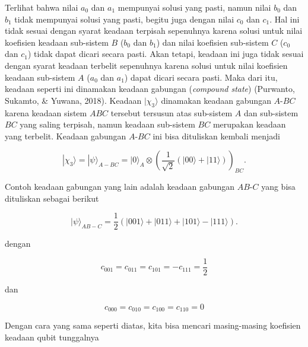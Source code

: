 Terlihat bahwa nilai $a_0$ dan $a_1$ mempunyai solusi yang pasti, namun nilai $b_0$ dan $b_1$ tidak mempunyai solusi yang pasti, begitu juga dengan nilai $c_0$ dan $c_1$. Hal ini tidak sesuai dengan syarat keadaan terpisah sepenuhnya karena solusi untuk nilai koefisien keadaan sub-sistem $B$ ($b_0$ dan $b_1$) dan nilai koefisien sub-sistem $C$ ($c_0$ dan $c_1$) tidak dapat dicari secara pasti. Akan tetapi, keadaan ini juga tidak sesuai dengan syarat keadaan terbelit sepenuhnya karena solusi untuk nilai koefisien keadaan sub-sistem $A$ ($a_0$ dan $a_1$) dapat dicari secara pasti. Maka dari itu, keadaan seperti ini dinamakan
keadaan gabungan (\textit{compound state}) (Purwanto, Sukamto, \& Yuwana, 2018).
Keadaan $|\chi_3\rangle$ dinamakan keadaan gabungan $A$-$BC$
karena keadaan sistem $ABC$ tersebut tersusun atas sub-sistem $A$ dan sub-sistem $BC$ yang saling terpisah, namun keadaan sub-sistem $BC$ merupakan keadaan yang terbelit. Keadaan gabungan $A$-$BC$ ini bisa dituliskan kembali menjadi

\begin{equation}
|\chi_3\rangle
=
|\psi\rangle_{A-BC}
=
|0\rangle_A \otimes
\left(
\frac{1}{\sqrt{2}}
(|00\rangle + |11\rangle)
\right)_{BC} .
\end{equation}

Contoh keadaan gabungan yang lain adalah keadaan gabungan $AB$-$C$ yang bisa dituliskan sebagai berikut

\begin{equation}
|\psi\rangle_{AB-C}
=
\frac{1}{2}
\left(
|001\rangle + |011\rangle + |101\rangle - |111\rangle
\right) .
\end{equation}

dengan

\begin{equation}
	c_{001}=c_{011}=c_{101}=-c_{111}=\frac{1}{2}
\end{equation}

dan

\begin{equation}
	c_{000}=c_{010}=c_{100}=c_{110}=0
\end{equation}

Dengan cara yang sama seperti diatas, kita bisa mencari masing-masing koefisien keadaan qubit tunggalnya

